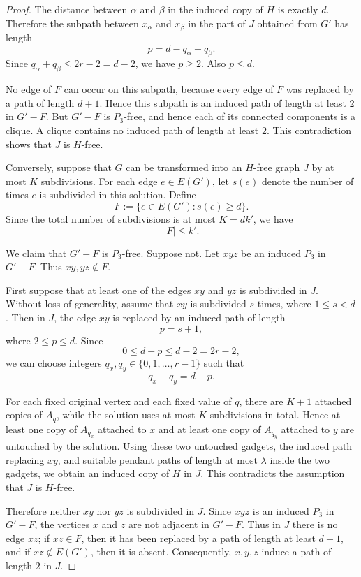 \documentclass[a4paper,UKenglish,cleveref, autoref, thm-restate]{lipics-v2021}
\begin{document}
\begin{proof}
The distance between $\alpha$ and $\beta$ in the induced copy of $H$ is exactly
$d$.  Therefore the subpath between $x_\alpha$ and $x_\beta$ in the part of
$J$ obtained from $G'$ has length
\[
    p=d-q_\alpha-q_\beta .
\]
Since $q_\alpha+q_\beta\leq 2r-2=d-2$, we have $p\geq 2$.  Also $p\leq d$.

No edge of $F$ can occur on this subpath, because every edge of $F$ was replaced
by a path of length $d+1$.  Hence this subpath is an induced path of length at
least $2$ in $G'-F$.  But $G'-F$ is $P_3$-free, and hence each of its connected
components is a clique.  A clique contains no induced path of length at least
$2$.  This contradiction shows that $J$ is $H$-free.

Conversely, suppose that $G$ can be transformed into an $H$-free graph $J$ by
at most $K$ subdivisions.  For each edge $e\in E(G')$, let $s(e)$ denote the
number of times $e$ is subdivided in this solution.  Define
\[
    F:=\{e\in E(G') : s(e)\geq d\}.
\]
Since the total number of subdivisions is at most $K=dk'$, we have
\[
    |F|\leq k'.
\]

We claim that $G'-F$ is $P_3$-free.  Suppose not.  Let $xyz$ be an induced
$P_3$ in $G'-F$.  Thus $xy,yz\notin F$.

First suppose that at least one of the edges $xy$ and $yz$ is subdivided in
$J$.  Without loss of generality, assume that $xy$ is subdivided $s$ times,
where $1\leq s<d$.  Then in $J$, the edge $xy$ is replaced by an induced path
of length
\[
    p=s+1,
\]
where $2\leq p\leq d$.  Since
\[
    0\leq d-p\leq d-2=2r-2,
\]
we can choose integers $q_x,q_y\in\{0,1,\ldots,r-1\}$ such that
\[
    q_x+q_y=d-p.
\]

For each fixed original vertex and each fixed value of $q$, there are $K+1$
attached copies of $A_q$, while the solution uses at most $K$ subdivisions in
total.  Hence at least one copy of $A_{q_x}$ attached to $x$ and at least one
copy of $A_{q_y}$ attached to $y$ are untouched by the solution.  Using these
two untouched gadgets, the induced path replacing $xy$, and suitable pendant
paths of length at most $\lambda$ inside the two gadgets, we obtain an induced
copy of $H$ in $J$.  This contradicts the assumption that $J$ is $H$-free.

Therefore neither $xy$ nor $yz$ is subdivided in $J$.  Since $xyz$ is an
induced $P_3$ in $G'-F$, the vertices $x$ and $z$ are not adjacent in $G'-F$.
Thus in $J$ there is no edge $xz$; if $xz\in F$, then it has been replaced by a
path of length at least $d+1$, and if $xz\notin E(G')$, then it is absent.
Consequently, $x,y,z$ induce a path of length $2$ in $J$.


\end{proof}
\end{document}
